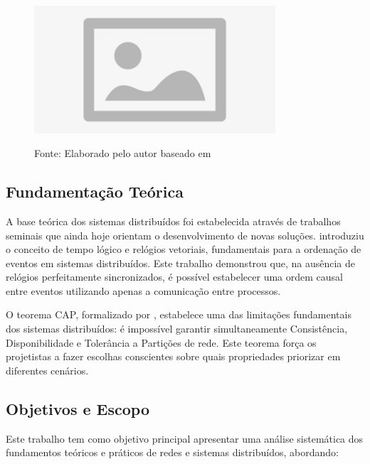 \begin{figure}[H]
\centering
{}
\includegraphics[width=0.8\textwidth]{figure/placeholder.jpg}

\label{fig:arquitetura_distribuida}
{\fontsize{10pt}{\baselineskip}\selectfont
  Fonte: Elaborado pelo autor baseado em }
\end{figure}

\subsection{Fundamentação Teórica}

A base teórica dos sistemas distribuídos foi estabelecida através de trabalhos seminais que ainda hoje orientam o desenvolvimento de novas soluções.  introduziu o conceito de tempo lógico e relógios vetoriais, fundamentais para a ordenação de eventos em sistemas distribuídos. Este trabalho demonstrou que, na ausência de relógios perfeitamente sincronizados, é possível estabelecer uma ordem causal entre eventos utilizando apenas a comunicação entre processos.

O teorema CAP, formalizado por , estabelece uma das limitações fundamentais dos sistemas distribuídos: é impossível garantir simultaneamente Consistência, Disponibilidade e Tolerância a Partições de rede. Este teorema força os projetistas a fazer escolhas conscientes sobre quais propriedades priorizar em diferentes cenários.

\subsection{Objetivos e Escopo}

Este trabalho tem como objetivo principal apresentar uma análise sistemática dos fundamentos teóricos e práticos de redes e sistemas distribuídos, abordando:

